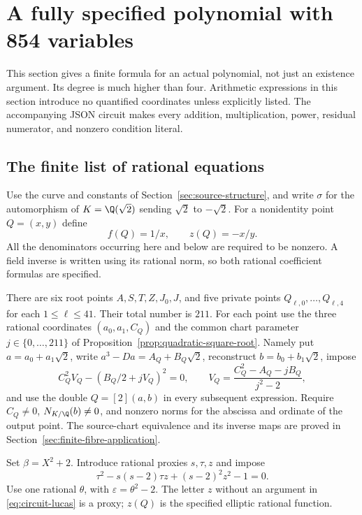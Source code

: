 \section{A fully specified polynomial with 854 variables}
\label{sec:explicit-circuit}

This section gives a finite formula for an actual polynomial, not just
an existence argument. Its degree is much higher than four. Arithmetic
expressions in this section introduce no quantified coordinates unless
explicitly listed. The accompanying JSON circuit makes every addition,
multiplication, power, residual numerator, and nonzero condition literal.

\subsection{The finite list of rational equations}

Use the curve and constants of Section~\ref{sec:source-structure}, and
write $\sigma$ for the automorphism of $K=\Q(\sqrt2)$ sending
$\sqrt2$ to $-\sqrt2$. For a nonidentity point $Q=(x,y)$ define
\[
 f(Q)=1/x,\qquad z(Q)=-x/y.
\]
All the denominators occurring here and below are required to be
nonzero. A field inverse is written using its rational norm, so both
rational coefficient formulas are specified.

There are six root points $A,S,T,Z,J_0,J$, and five private points
$Q_{\ell,0},\ldots,Q_{\ell,4}$ for each $1\leq\ell\leq41$.
Their total number is $211$. For each point use the three rational
coordinates $(a_0,a_1,C_Q)$ and the common chart parameter
$j\in\{0,\ldots,211\}$ of
Proposition~\ref{prop:quadratic-square-root}. Namely put
$a=a_0+a_1\sqrt2$, write $a^3-Da=A_Q+B_Q\sqrt2$, reconstruct
$b=b_0+b_1\sqrt2$, impose
\[
 C_Q^2 V_Q-(B_Q/2+jV_Q)^2=0,
 \qquad V_Q=\frac{C_Q^2-A_Q-jB_Q}{j^2-2},
\]
and use the double $Q=[2](a,b)$ in every subsequent expression.
Require $C_Q\ne0$, $N_{K/\Q}(b)\ne0$, and nonzero norms for
the abscissa and ordinate of the output point. The source-chart
equivalence and its inverse maps are proved in
Section~\ref{sec:finite-fibre-application}.

Set $\beta=X^2+2$. Introduce rational proxies $s,\tau,z$ and impose
\begin{equation}\label{eq:circuit-lucas}
 \tau^2-s(s-2)\tau z+(s-2)^2z^2-1=0.
\end{equation}
Use one rational $\theta$, with $\varepsilon=\theta^2-2$.
The letter $z$ without an argument in \eqref{eq:circuit-lucas}
is a proxy; $z(Q)$ is the specified elliptic rational function.

